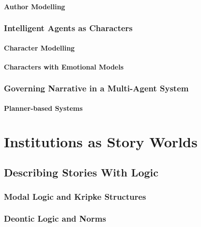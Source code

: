 \documentclass[11pt]{report}
\begin{document}
\subsubsection{Author Modelling}


\subsection{Intelligent Agents as Characters}

\subsubsection{Character Modelling}

\subsubsection{Characters with Emotional Models}



\subsection{Governing Narrative in a Multi-Agent System}
\subsubsection{Planner-based Systems}

\chapter{Institutions as Story Worlds}
\label{cha:institutions}
\section{Describing Stories With Logic}
\subsection{Modal Logic and Kripke Structures}
\subsection{Deontic Logic and Norms}
\end{document}
